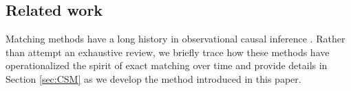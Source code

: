 \documentclass{article}
\newcommand{\note}[1]{\textcolor{red}{\textit{#1}}}
\begin{document}

\subsection{Related work}
\label{sec:related}




Matching methods have a long history in observational causal inference \citep{stuart2010matching}.
Rather than attempt an exhaustive review, we briefly trace how these methods have operationalized the spirit of exact matching over time and provide details in Section \ref{sec:CSM} as we develop the method introduced in this paper.
\end{document}
